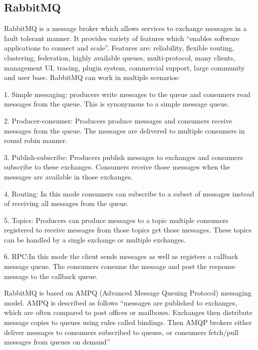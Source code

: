\subsection{ RabbitMQ}

     RabbitMQ is a message broker \cite{www-rabbitmq} which allows
     services to exchange messages in a fault tolerant manner. It
     provides variety of features which ``enables software applications
     to connect and scale''. Features are: reliability, flexible
     routing, clustering, federation, highly available queues,
     multi-protocol, many clients, management UI, tracing, plugin
     system, commercial support, large community and user
     base. RabbitMQ can work in multiple scenarios:

     1. Simple messaging: producers write messages to the queue and
        consumers read messages from the queue. This is synonymous
        to a simple message queue.

     2. Producer-consumer: Producers produce messages and consumers
        receive messages from the queue. The messages are delivered to
        multiple consumers in round robin manner.

     3. Publish-subscribe: Producers publish messages to exchanges
        and consumers subscribe to these exchanges. Consumers receive
        those messages when the messages are available in those
        exchanges.

     4. Routing: In this mode consumers can subscribe to a subset
        of messages instead of receiving all messages from the queue.

     5. Topics: Producers can produce messages to a topic multiple
        consumers registered to receive messages from those topics get
        those messages. These topics can be handled by a single
        exchange or multiple exchanges.

     6. RPC:In this mode the client sends messages as well as
        registers a callback message queue. The consumers consume the
        message and post the response message to the callback queue.

        RabbitMQ is based on AMPQ \cite{ampq-article} (Advanced
        Message Queuing Protocol) messaging model. AMPQ is described
        as follows ``messages are published to exchanges, which are
        often compared to post offices or mailboxes. Exchanges then
        distribute message copies to queues using rules called
        bindings. Then AMQP brokers either deliver messages to
        consumers subscribed to queues, or consumers fetch/pull
        messages from queues on demand''

